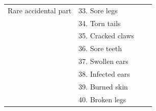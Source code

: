 \documentclass[10pt,letterpaper]{article}
\begin{document}
\begin{table}[h]
\begin{tabular}{| l || l | l | l |}
Rare accidental part    & 33. Sore legs       &                &                     \\
                                          & 34. Torn tails                       &                &                     \\
                                          & 35. Cracked claws                         &                &                     \\
                                          & 36. Sore teeth                       &                &                     \\
                                          & 37. Swollen ears                      &                &                     \\
                                          & 38. Infected ears                    &                &                     \\
                                          & 39. Burned skin                       &                &                     \\
                                          & 40. Broken legs                     &                &                     \\                                                                                          
                                           \hline

\end{tabular}
\end{table}



\setlength{\bibleftmargin}{.125in}
\setlength{\bibindent}{-\bibleftmargin}


\end{document}

